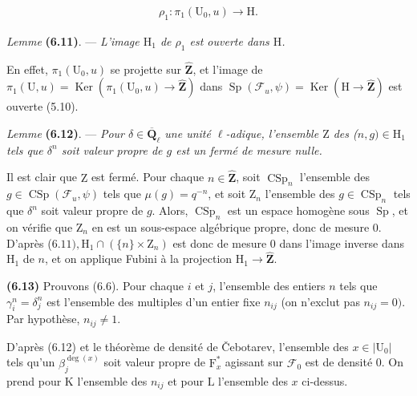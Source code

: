 \documentclass[10pt,leqno]{article}
\begin{document}
\begin{equation*}\begin{gathered}\rho _{1} : \pi _{1}(\mathrm{U}_{0},u) \longrightarrow  \mathrm{H}.\end{gathered}\end{equation*}

\noindent \emph{Lemme} \textbf{(6.11)}. — {\itshape L’image \(\mathrm{H}_{1}\) de \(\rho _{1}\) est ouverte dans \(\mathrm{H}\).}\par

\noindent En effet, \(\pi _{1}(\mathrm{U}_{0},u)\) se projette sur \(\widehat{\mathbf{Z}}\), et l’image de \(\pi _{1}(\mathrm{U},u)=\operatorname{Ker}(\pi _{1}(\mathrm{U}_{0},u)\longrightarrow \widehat{\mathbf{Z}})\) dans \(\operatorname{Sp}(\mathcal{F} _{u},\psi )=\operatorname{Ker}(\mathrm{H}\longrightarrow \widehat{\mathbf{Z}})\) est ouverte (5.10).\par

\noindent \emph{Lemme} \textbf{(6.12)}. — {\itshape Pour \(\delta \in \overline{\mathbf{Q}}_{\ell }\) une unité \(\ell \)-adique, l’ensemble \(\mathrm{Z}\) des (\(n,g)\in \mathrm{H}_{1}\) tels que \(\delta ^{n}\) soit valeur propre de \(g\) est un fermé de mesure nulle.}\par

\noindent Il est clair que \(\mathrm{Z}\) est fermé. Pour chaque \(n\in \widehat{\mathbf{Z}}\), soit \(\operatorname{CSp}_{n}\) l’ensemble des \(g\in \operatorname{CSp}(\mathcal{F} _{u},\psi )\) tels que \(\mu (g)=q^{- n}\), et soit \(\mathrm{Z}_{n}\) l’ensemble des \(g\in \operatorname{CSp}_{n}\) tels que \(\delta ^{n}\) soit valeur propre de \(g\). Alors, \(\operatorname{CSp}_{n}\) est un espace homogène sous \(\operatorname{Sp}\), et on vérifie que \(\mathrm{Z}_{n}\) en est un sous-espace algébrique propre, donc de mesure 0. D’après (\(6.11), \mathrm{H}_{1}\cap (\{n\}\times \mathrm{Z}_{n})\) est donc de mesure 0 dans l’image inverse dans \(\mathrm{H}_{1}\) de \(n\), et on applique Fubini à la projection \(\mathrm{H}_{1}\longrightarrow \widehat{\mathbf{Z}}\).\par

\noindent \textbf{(6.13)} Prouvons (6.6). Pour chaque \(i\) et \(j\), l’ensemble des entiers \(n\) tels que \(\gamma _{i}^{n}=\delta _{j}^{n}\) est l’ensemble des multiples d’un entier fixe \(n_{ij}\) (on n’exclut pas \(n_{ij}=0)\). Par hypothèse, \(n_{ij}\ne 1\).\par

\noindent D’après (6.12) et le théorème de densité de Čebotarev, l’ensemble des \(x\in |\mathrm{U}_{0}|\) tels qu’un \(\beta _{j}^{\operatorname{deg}(x)}\) soit valeur propre de \(\mathrm{F}_{x}^{*}\) agissant sur \(\mathcal{F} _{0}\) est de densité 0. On prend pour \(\mathrm{K}\) l’ensemble des \(n_{ij}\) et pour \(\mathrm{L}\) l’ensemble des \(x\) ci-dessus.\par
\end{document}
